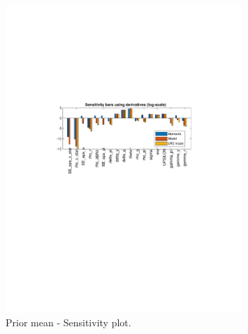 
\begin{figure}[H]
\centering 
\includegraphics[width=0.8\textwidth]{nash/identification/nash_sensitivity_prior_mean}
\caption{Prior mean  - Sensitivity plot.}\label{Fig:sensitivity:prior_mean}
\end{figure}

